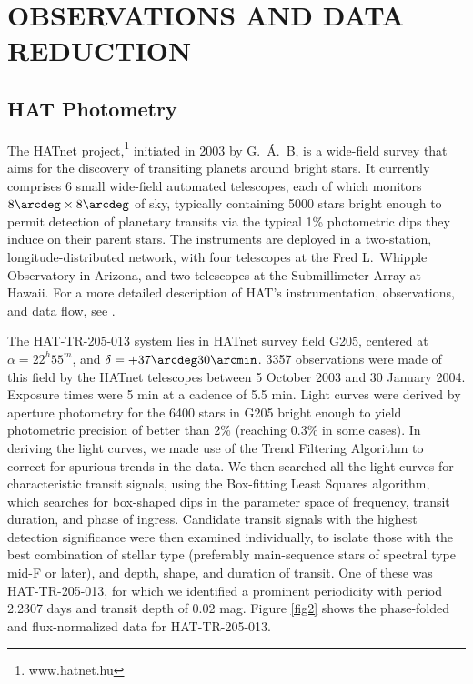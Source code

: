 \documentclass[12pt, preprint]{aastex}
\begin{document}
\section{OBSERVATIONS AND DATA REDUCTION}

\subsection{HAT Photometry}

The HATnet project,\footnote{www.hatnet.hu} initiated in 2003 by
G.~\'A.~B, is a wide-field survey that aims for the discovery of
transiting planets around bright stars. It currently comprises 6 small
wide-field automated telescopes, each of which monitors
$8\arcdeg\times8\arcdeg$ of sky, typically containing 5000 stars
bright enough to permit detection of planetary transits via the
typical 1\% photometric dips they induce on their parent stars. The
instruments are deployed in a two-station, longitude-distributed
network, with four telescopes at the Fred L.\ Whipple Observatory in
Arizona, and two telescopes at the Submillimeter Array at Hawaii. For
a more detailed description of HAT's instrumentation, observations,
and data flow, see \cite{bakos2002,bakos2004}.

The HAT-TR-205-013 system lies in HATnet survey field G205, centered at $\alpha = 22^h55^m$, and $\delta = +37\arcdeg30\arcmin$. 3357 observations were made of this field by the HATnet telescopes between 5 October 2003 and 30 January 2004. Exposure times were 5 min at a cadence of 5.5 min. Light curves were derived by aperture photometry for the 6400 stars in G205 bright enough to yield photometric precision of better than 2\% (reaching 0.3\% in some cases). In deriving the light curves, we made use of the Trend Filtering Algorithm \citep{kovacs05} to correct for spurious trends in the data. We then searched all the light curves for characteristic transit signals, using the Box-fitting Least Squares \citep{kovacs02} algorithm, which searches for box-shaped dips in the parameter space of frequency, transit duration, and phase of ingress. Candidate transit signals with the highest detection significance were then examined individually, to isolate those with the best combination of stellar type (preferably main-sequence stars of spectral type mid-F or later), and depth, shape, and duration of transit.  One of these was HAT-TR-205-013, for which we identified a prominent periodicity with period 2.2307 days and transit depth of 0.02 mag. Figure \ref{fig2} shows the phase-folded and flux-normalized data for HAT-TR-205-013.
\end{document}

